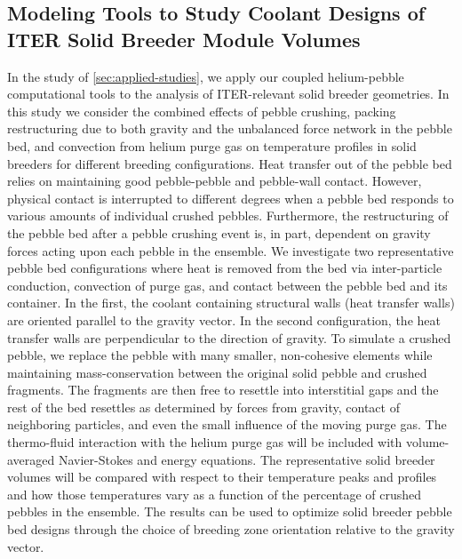\subsection*{Modeling Tools to Study Coolant Designs of ITER Solid Breeder Module Volumes}
In the study of \cref{sec:applied-studies}, we apply our coupled helium-pebble computational tools to the analysis of ITER-relevant solid breeder geometries. In this study we consider the combined effects of pebble crushing, packing restructuring due to both gravity and the unbalanced force network in the pebble bed, and convection from helium purge gas on temperature profiles in solid breeders for different breeding configurations. Heat transfer out of the pebble bed relies on maintaining good pebble-pebble and pebble-wall contact. However, physical contact is interrupted to different degrees when a pebble bed responds to various amounts of individual crushed pebbles. Furthermore, the restructuring of the pebble bed after a pebble crushing event is, in part, dependent on gravity forces acting upon each pebble in the ensemble. We investigate two representative pebble bed configurations where heat is removed from the bed via inter-particle conduction, convection of purge gas, and contact between the pebble bed and its container. In the first, the coolant containing structural walls (heat transfer walls) are oriented parallel to the gravity vector. In the second configuration, the heat transfer walls are perpendicular to the direction of gravity. To simulate a crushed pebble, we replace the pebble with many smaller, non-cohesive elements while maintaining mass-conservation between the original solid pebble and crushed fragments. The fragments are then free to resettle into interstitial gaps and the rest of the bed resettles as determined by forces from gravity, contact of neighboring particles, and even the small influence of the moving purge gas. The thermo-fluid interaction with the helium purge gas will be included with volume-averaged Navier-Stokes and energy equations. The representative solid breeder volumes will be compared with respect to their temperature peaks and profiles and how those temperatures vary as a function of the percentage of crushed pebbles in the ensemble. The results can be used to optimize solid breeder pebble bed designs through the choice of breeding zone orientation relative to the gravity vector.

